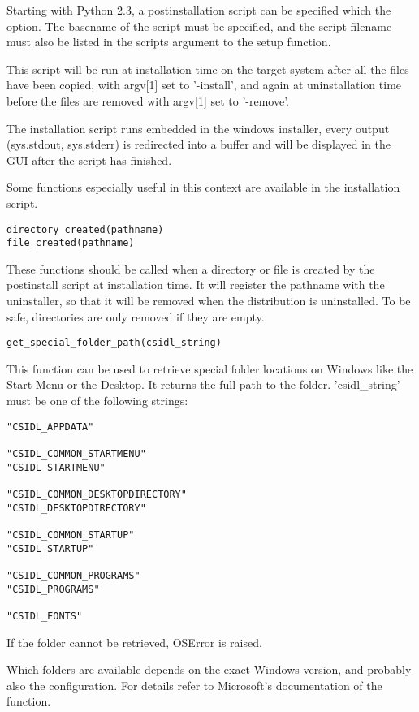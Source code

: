 \documentclass{howto}
\begin{document}
Starting with Python 2.3, a postinstallation script can be specified
which the  option.  The basename of the
script must be specified, and the script filename must also be listed
in the scripts argument to the setup function.

This script will be run at installation time on the target system
after all the files have been copied, with argv[1] set to '-install',
and again at uninstallation time before the files are removed with argv[1]
set to '-remove'.

The installation script runs embedded in the windows installer, every
output (sys.stdout, sys.stderr) is redirected into a buffer and will
be displayed in the GUI after the script has finished.

Some functions especially useful in this context are available in the
installation script.

\begin{verbatim}
directory_created(pathname)
file_created(pathname)
\end{verbatim}

These functions should be called when a directory or file is created
by the postinstall script at installation time.  It will register the
pathname with the uninstaller, so that it will be removed when the
distribution is uninstalled.  To be safe, directories are only removed
if they are empty.

\begin{verbatim}
get_special_folder_path(csidl_string)
\end{verbatim}

This function can be used to retrieve special folder locations on
Windows like the Start Menu or the Desktop.  It returns the full path
to the folder.  'csidl_string' must be one of the following strings:

\begin{verbatim}
"CSIDL_APPDATA"

"CSIDL_COMMON_STARTMENU"
"CSIDL_STARTMENU"

"CSIDL_COMMON_DESKTOPDIRECTORY"
"CSIDL_DESKTOPDIRECTORY"

"CSIDL_COMMON_STARTUP"
"CSIDL_STARTUP"

"CSIDL_COMMON_PROGRAMS"
"CSIDL_PROGRAMS"

"CSIDL_FONTS"
\end{verbatim}

If the folder cannot be retrieved, OSError is raised.

Which folders are available depends on the exact Windows version, and probably
also the configuration. For details refer to Microsoft's documentation of the
 function.
\end{document}

